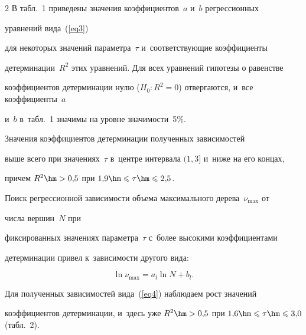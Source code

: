 \begin{multicols}{2}
\noindent В табл.~1 приведены значения коэффициентов~$a$ и~$b$ регрессионных 


уравнений вида~(\ref{eq3})


для некоторых значений параметра~$\tau$ и~соответствующие коэффициенты 


детерминации~$R^2$ этих уравнений. Для всех уравнений гипотезы о равенстве 


коэффициентов детерминации нулю ($H_0: R^2=0$) отвергаются, и~все коэффициенты~$a$ 


и~$b$ в~табл.~1 значимы на уровне значимости~5\%.




















Значения коэффициентов детерминации полученных зависимостей


выше всего при значениях~$\tau$ в~центре интервала $(1,3]$ и~ниже на его концах, 


причем $R^2\hm>0{,}5$ при $1{,}9\hm\leqslant\tau\hm\leqslant 2{,}5$.





Поиск регрессионной зависимости объема максимального дерева~$\nu_{\max}$ от 


числа вершин~$N$ при


фиксированных значениях параметра~$\tau$ с~более высокими коэффициентами 


детерминации привел к~зависимости другого вида:


\begin{equation}


\label{eq4}


\ln\nu_{\max} = a_l \ln N + b_l.


\end{equation}


Для полученных зависимостей вида~(\ref{eq4}) наблюдаем рост значений 


коэффициентов детерминации, и~здесь уже $R^2\hm>0{,}5$ при $1{,}6\hm\leqslant\tau\hm\leqslant 3{,}0$ (табл.~2).












\end{multicols}
